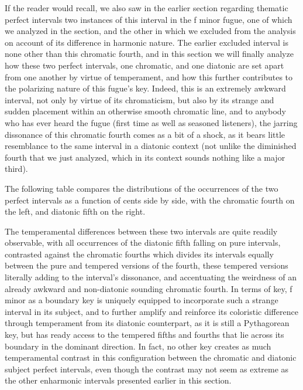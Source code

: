 If the reader would recall, we also saw in the earlier section regarding
thematic perfect intervals two instances of this interval in the f minor
fugue, one of which we analyzed in the section, and the other in which
we excluded from the analysis on account of its difference in harmonic
nature. The earlier excluded interval is none other than this chromatic
fourth, and in this section we will finally analyze how these two
perfect intervals, one chromatic, and one diatonic are set apart from
one another by virtue of temperament, and how this further contributes
to the polarizing nature of this fugue's key. Indeed, this is an
extremely awkward interval, not only by virtue of its chromaticism, but
also by its strange and sudden placement within an otherwise smooth
chromatic line, and to anybody who has ever heard the fugue (first time
as well as seasoned listeners), the jarring dissonance of this chromatic
fourth comes as a bit of a shock, as it bears little resemblance to the
same interval in a diatonic context (not unlike the diminished fourth
that we just analyzed, which in its context sounds nothing like a major
third).

The following table compares the distributions of the occurrences of the
two perfect intervals as a function of cents side by side, with the
chromatic fourth on the left, and diatonic fifth on the right.


    \begin{center}
    \end{center}
    
    The temperamental differences between these two intervals are quite
readily observable, with all occurrences of the diatonic fifth falling
on pure intervals, contrasted against the chromatic fourths which
divides its intervals equally between the pure and tempered versions of
the fourth, these tempered versions literally adding to the interval's
dissonance, and accentuating the weirdness of an already awkward and
non-diatonic sounding chromatic fourth. In terms of key, f minor as a
boundary key is uniquely equipped to incorporate such a strange interval
in its subject, and to further amplify and reinforce its coloristic
difference through temperament from its diatonic counterpart, as it is
still a Pythagorean key, but has ready access to the tempered fifths and
fourths that lie across its boundary in the dominant direction. In fact,
no other key creates as much temperamental contrast in this
configuration between the chromatic and diatonic subject perfect
intervals, even though the contrast may not seem as extreme as the other
enharmonic intervals presented earlier in this section.

